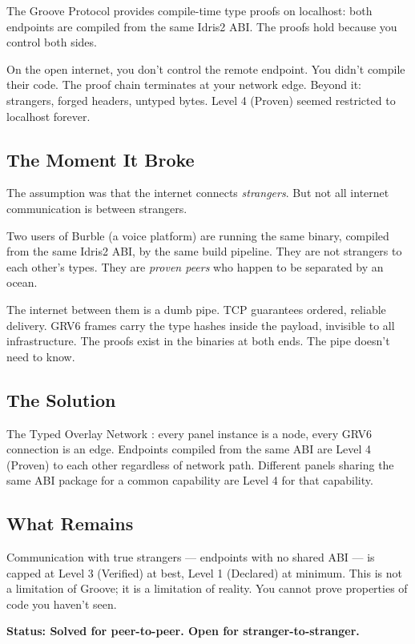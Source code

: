 \documentclass[11pt,a4paper]{article}
\begin{document}
The Groove Protocol provides compile-time type proofs on localhost: both
endpoints are compiled from the same Idris2 ABI. The proofs hold because
you control both sides.

On the open internet, you don't control the remote endpoint. You didn't
compile their code. The proof chain terminates at your network edge.
Beyond it: strangers, forged headers, untyped bytes. Level 4 (Proven)
seemed restricted to localhost forever.

\subsection{The Moment It Broke}

The assumption was that the internet connects \emph{strangers}. But not
all internet communication is between strangers.

Two users of Burble (a voice platform) are running the same binary,
compiled from the same Idris2 ABI, by the same build pipeline. They are
not strangers to each other's types. They are \emph{proven peers} who
happen to be separated by an ocean.

The internet between them is a dumb pipe. TCP guarantees ordered,
reliable delivery. GRV6 frames carry the type hashes inside the payload,
invisible to all infrastructure. The proofs exist in the binaries at
both ends. The pipe doesn't need to know.

\subsection{The Solution}

The Typed Overlay Network \cite{trust2026}: every panel instance is a
node, every GRV6 connection is an edge. Endpoints compiled from the same
ABI are Level 4 (Proven) to each other regardless of network path.
Different panels sharing the same ABI package for a common capability
are Level 4 for that capability.

\subsection{What Remains}

Communication with true strangers --- endpoints with no shared ABI ---
is capped at Level 3 (Verified) at best, Level 1 (Declared) at minimum.
This is not a limitation of Groove; it is a limitation of reality. You
cannot prove properties of code you haven't seen.

\textbf{Status: Solved for peer-to-peer. Open for stranger-to-stranger.}
\end{document}
